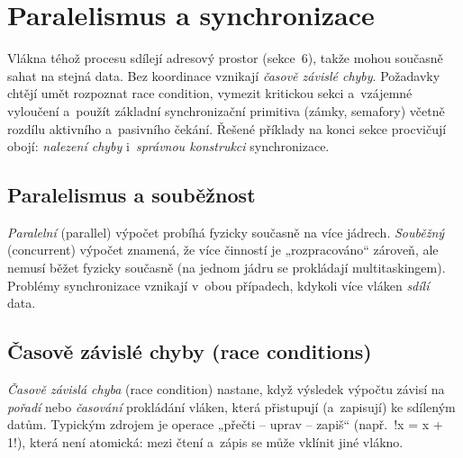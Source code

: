 \section{Paralelismus a synchronizace}

Vlákna téhož procesu sdílejí adresový prostor (sekce~6), takže mohou současně sahat na stejná data. Bez koordinace vznikají \emph{časově závislé chyby}. Požadavky chtějí umět rozpoznat race condition, vymezit kritickou sekci a~vzájemné vyloučení a~použít základní synchronizační primitiva (zámky, semafory) včetně rozdílu aktivního a~pasivního čekání. Řešené příklady na konci sekce procvičují obojí: \emph{nalezení chyby} i~\emph{správnou konstrukci} synchronizace.

\subsection{Paralelismus a souběžnost}

\begin{definice}
\emph{Paralelní} (parallel) výpočet probíhá fyzicky současně na více jádrech. \emph{Souběžný} (concurrent) výpočet znamená, že více činností je „rozpracováno`` zároveň, ale nemusí běžet fyzicky současně (na jednom jádru se prokládají multitaskingem). Problémy synchronizace vznikají v~obou případech, kdykoli více vláken \emph{sdílí} data.
\end{definice}

\subsection{Časově závislé chyby (race conditions)}

\begin{definice}
\emph{Časově závislá chyba} (race condition) nastane, když výsledek výpočtu závisí na \emph{pořadí} nebo \emph{časování} prokládání vláken, která přistupují (a~zapisují) ke sdíleným datům. Typickým zdrojem je operace „přečti -- uprav -- zapiš`` (např.\ \cd!x = x + 1!), která není atomická: mezi čtení a~zápis se může vklínit jiné vlákno.
\end{definice}

